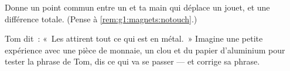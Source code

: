 \begin{exercise}[$\star$]\label{exo:g1:magnets:8}
Donne un point commun entre un  et ta main qui déplace un
jouet, et une différence totale. (Pense à
\cref{rem:g1:magnets:notouch}.)
\end{exercise}

\begin{exercise}[$\star\star$]\label{exo:g1:magnets:9}
Tom dit~: «~Les  attirent tout ce qui est en métal.~» Imagine
une petite expérience avec une pièce de monnaie, un clou et du papier
d'aluminium pour tester la phrase de Tom, dis ce qui va se passer ---
et corrige sa phrase.
\end{exercise}
